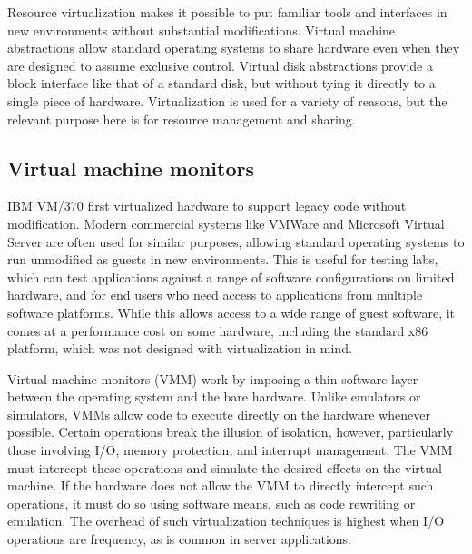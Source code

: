 Resource virtualization makes it possible to put familiar tools and interfaces in new environments without substantial modifications. Virtual machine abstractions allow standard operating systems to share hardware even when they are designed to assume exclusive control. Virtual disk abstractions provide a block interface like that of a standard disk, but without tying it directly to a single piece of hardware. Virtualization is used for a variety of reasons, but the relevant purpose here is for resource management and sharing.

\subsection{Virtual machine monitors}

IBM VM/370 \cite{gum} first virtualized hardware to support legacy code without modification. Modern commercial systems like VMWare \cite{vmware} and Microsoft Virtual Server \cite{microsoftvm} are often used for similar purposes, allowing standard operating systems to run unmodified as guests in new environments. This is useful for testing labs, which can test applications against a range of software configurations on limited hardware, and for end users who need access to applications from multiple software platforms. While this allows access to a wide range of guest software, it comes at a performance cost on some hardware, including the standard x86 platform, which was not designed with virtualization in mind.

Virtual machine monitors (VMM) work by imposing a thin software layer between the operating system and the bare hardware. Unlike emulators or simulators, VMMs allow code to execute directly on the hardware whenever possible. Certain operations break the illusion of isolation, however, particularly those involving I/O, memory protection, and interrupt management. The VMM must intercept these operations and simulate the desired effects on the virtual machine. If the hardware does not allow the VMM to directly intercept such operations, it must do so using software means, such as code rewriting or emulation. The overhead of such virtualization techniques is highest when I/O operations are frequency, as is common in server applications.


